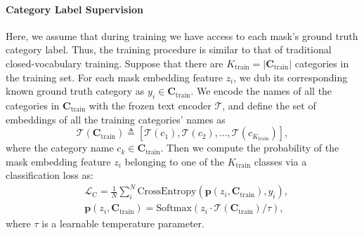 \documentclass[10pt,twocolumn,letterpaper]{article}
\begin{document}
\paragraph{Category Label Supervision}
Here, we assume that during training we have access to each mask's ground truth category label. Thus, the training procedure is similar to that of traditional closed-vocabulary training. 
Suppose that there are $K_\text{train} = |\mathbf{C}_{\text{train}}|$ categories in the training set. For each mask embedding feature $z_i$, we dub its corresponding known ground truth category as $y_i \in \mathbf{C}_{\text{train}}$.
We encode the names of all the categories in $\mathbf{C}_{\text{train}}$ with the frozen text encoder $\mathcal{T}$,
and define the set of embeddings of all the training categories' names as
\begin{equation}
\mathcal{T}(\mathbf{C}_\text{train}) \triangleq [\mathcal{T}(c_1), \mathcal{T}(c_2), \dots, \mathcal{T}(c_{K_\text{train}})],
\end{equation} 
where the category name $ c_k \in \mathbf{C}_{\text{train}}$. 
Then we compute the probability of the mask embedding feature $z_i$ belonging to one of the $K_\text{train}$ classes via a classification loss as:
\begin{align}
    & \mathcal{L}_\text{C} = \frac{1}{N}\sum_{i}^{N}\text{CrossEntropy}(\mathbf{p}(z_i, \mathbf{C}_\text{train}), y_i),\\
    \label{eq:prob}
    & \mathbf{p}(z_i, \mathbf{C}_\text{train}) = \text{Softmax}(z_i \cdot \mathcal{T}(\mathbf{C}_\text{train})/\tau),
\end{align}
where $\tau$ is a learnable temperature parameter. 
\end{document}
